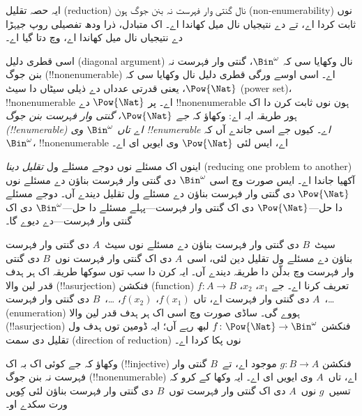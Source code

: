 \documentclass[../../../include/open-logic-section]{subfiles}
\begin{document}


\begin{editorial}
  ایہ حصہ تقلیل (reduction) نال گنتی وار فہرست نہ بنن جوگ ہون
  (non-enumerability) نوں ثابت کردا اے، تے  دے
  نتیجیاں نال میل کھاندا اے۔ اک متبادل، ذرا ودھ تفصیلی روپ جیہڑا
   دے نتیجیاں نال میل کھاندا اے، 
  وچ دتا گیا اے۔
\end{editorial}

اسی قطری دلیل (diagonal argument) نال وکھایا سی کہ $\Bin^\omega$،
گنتی وار فہرست نہ بنن جوگ (!!{nonenumerable}) اے۔ اسی اوسے ورگی قطری
دلیل نال وکھایا سی کہ $\Pow{\Nat}$، یعنی قدرتی عدداں دے ذیلی سیٹاں
دا سیٹ (power set)، !!{nonenumerable} اے۔ پر $\Pow{\Nat}$ دے
!!{nonenumerable} ہون نوں ثابت کرن دا اک ہور طریقہ ایہ اے: وکھاؤ کہ
\emph{جے $\Pow{\Nat}$، گنتی وار فہرست بنن جوگ (!!{enumerable}) اے
تاں $\Bin^\omega$ وی !!{enumerable} اے}۔ کیوں جے اسی جاندے آں کہ
$\Bin^\omega$، !!{nonenumerable} اے، ایس لئی $\Pow{\Nat}$ وی ایویں
ای اے۔

اینوں اک مسئلے نوں دوجے مسئلے ول \emph{تقلیل دینا} (reducing one
problem to another) آکھیا جاندا اے۔ ایس صورت وچ اسی $\Bin^\omega$ دی
گنتی وار فہرست بناؤن دے مسئلے نوں $\Pow{\Nat}$ دی گنتی وار فہرست
بناؤن دے مسئلے ول تقلیل دیندے آں۔ دوجے مسئلے دا حل---$\Pow{\Nat}$ دی
اک گنتی وار فہرست---پہلے مسئلے دا حل---$\Bin^\omega$ دی اک گنتی وار
فہرست---دے دیوے گا۔

سیٹ~$B$ دی گنتی وار فہرست بناؤن دے مسئلے نوں سیٹ~$A$ دی گنتی وار
فہرست بناؤن دے مسئلے ول تقلیل دین لئی، اسی~$A$ دی اک گنتی وار فہرست
نوں~$B$ دی گنتی وار فہرست وچ بدلّن دا طریقہ دیندے آں۔ ایہ کرن دا سب
توں سوکھا طریقہ اک ہر ہدف قدر لین والا (!!a{surjection}) فنکشن
(function) $f\colon A \to B$ تعریف کرنا اے۔ جے $x_1$، $x_2$،
\dots{}،~$A$ دی گنتی وار فہرست اے، تاں $f(x_1)$، $f(x_2)$،
\dots{}،~$B$ دی گنتی وار فہرست (enumeration) ہووے گی۔ ساڈی صورت وچ
اسی اک ہر ہدف قدر لین والا (!!a{surjection}) فنکشن
$f\colon \Pow{\Nat} \to \Bin^\omega$ لبھ رہے آں؛ ایہ ڈومین توں ہدف
ول تقلیل دی سمت (direction of reduction) نوں پکا کردا اے۔

\begin{prob}
وکھاؤ کہ جے کوئی اک بہ اک (!!{injective}) فنکشن $g\colon B \to A$
موجود اے، تے~$B$ گنتی وار فہرست نہ بنن جوگ (!!{nonenumerable}) اے،
تاں~$A$ وی ایویں ای اے۔ ایہ وکھا کے کرو کہ تسیں~$g$ نوں~$A$ دی اک
گنتی وار فہرست توں~$B$ دی گنتی وار فہرست بناؤن لئی کِویں ورت سکدے او۔
\end{prob}
\end{document}
